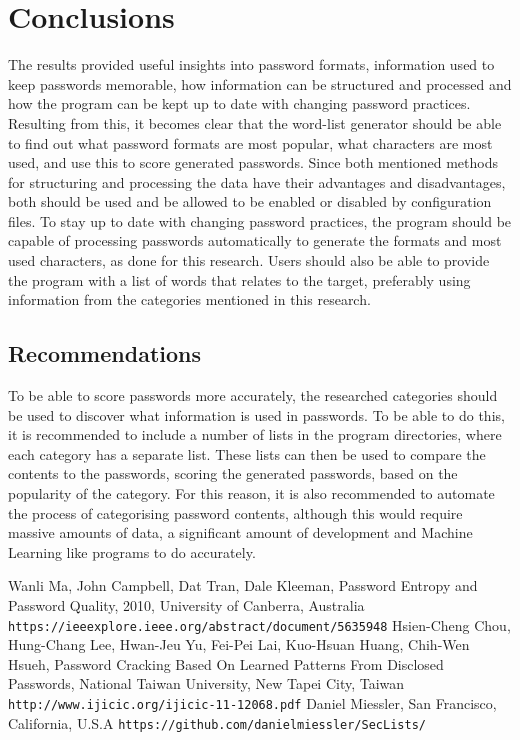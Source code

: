 \documentclass[a4paper,12pt]{article}
\begin{document}
\newpage
\section{Conclusions}

The results provided useful insights into password formats, information used to keep passwords memorable, how information can be structured and processed and how the program can be kept up to date with changing password practices. Resulting from this, it becomes clear that the word-list generator should be able to find out what password formats are most popular, what characters are most used, and use this to score generated passwords. Since both mentioned methods for structuring and processing the data have their advantages and disadvantages, both should be used and be allowed to be enabled or disabled by configuration files. To stay up to date with changing password practices, the program should be capable of processing passwords automatically to generate the formats and most used characters, as done for this research. Users should also be able to provide the program with a list of words that relates to the target, preferably using information from the categories mentioned in this research.

\subsection{Recommendations}

To be able to score passwords more accurately, the researched categories should be used to discover what information is used in passwords. To be able to do this, it is recommended to include a number of lists in the program directories, where each category has a separate list. These lists can then be used to compare the contents to the passwords, scoring the generated passwords, based on the popularity of the category. For this reason, it is also recommended to automate the process of categorising password contents, although this would require massive amounts of data, a significant amount of development and Machine Learning like programs to do accurately.

\newpage
\begin{thebibliography}{9}
   Wanli Ma, John Campbell, Dat Tran, Dale Kleeman, Password Entropy and Password Quality, 2010, University of Canberra, Australia \texttt{https://ieeexplore.ieee.org/abstract/document/5635948}
   Hsien-Cheng Chou, Hung-Chang Lee, Hwan-Jeu Yu, Fei-Pei Lai, Kuo-Hsuan Huang, Chih-Wen Hsueh, Password Cracking Based On Learned Patterns From Disclosed Passwords, National Taiwan University, New Tapei City, Taiwan \texttt{http://www.ijicic.org/ijicic-11-12068.pdf}
   Daniel Miessler, San Francisco, California, U.S.A \texttt{https://github.com/danielmiessler/SecLists/}
\end{thebibliography}
\end{document}
